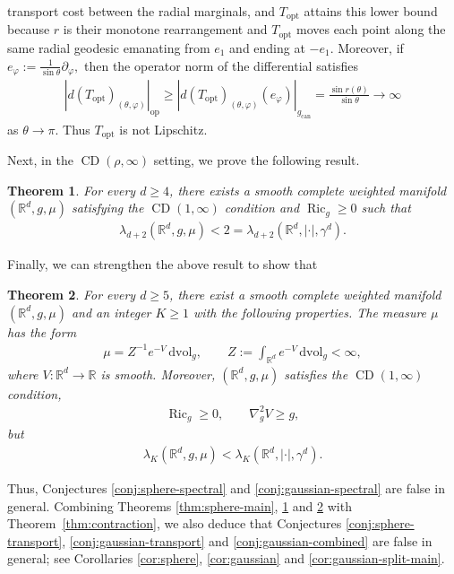 \documentclass[11pt,reqno]{amsart}
\numberwithin{equation}{section}
\newtheorem{mainthm}{Theorem}
\theoremstyle{definition}
\theoremstyle{remark}
\def\bR {\mathbb{R}}
\newcommand{\0}{\emptyset}
\newcommand{\Ric}{\operatorname{Ric}}
\newcommand{\can}{\mathrm{can}}
\newcommand{\dvol}{\,\mathrm{dvol}}
\newcommand{\CD}{\operatorname{CD}}
\begin{document}
transport cost between the radial marginals, and $T_{\mathrm{opt}}$
attains this lower bound because $r$ is their monotone rearrangement and
$T_{\mathrm{opt}}$ moves each point along the same radial geodesic emanating from $e_1$ and ending at $-e_1.$ Moreover,
if $ e_\varphi :=\frac{1}{\sin\theta}\partial_\varphi,$ then the operator norm of the differential satisfies
\begin{align}
        \left|
        d(T_{\mathrm{opt}})_{(\theta,\varphi)}
        \right|_{\mathrm{op}}
        \geq
        \left|
        d(T_{\mathrm{opt}})_{(\theta,\varphi)}
        (e_\varphi)
        \right|_{g_{\can}}
        =
        \frac{\sin r(\theta)}{\sin\theta}
        \rightarrow
        \infty
\end{align}
as $\theta\to\pi$. Thus $T_{\mathrm{opt}}$ is not Lipschitz.

Next, in the $\CD(\rho,\infty)$ setting, we prove the following result.
\begin{mainthm}\label{thm:gaussian-main}
For every $d\geq4$, there exists a smooth complete weighted manifold $(\bR^d,g,\mu)$ satisfying the $\CD(1,\infty)$ condition and $\Ric_g\geq0$ such that
\begin{align}\label{eqn:index-gaussian-K}
\lambda_{d+2}(\bR^d,g,\mu)<2=
\lambda_{d+2}(\bR^d,|\cdot|,
\gamma^d).    
\end{align}
\end{mainthm}
Finally, we can strengthen the above result to show that
\begin{mainthm}\label{thm:gaussian-split-main}
For every $d\geq5$, there exist a smooth complete weighted manifold $(\bR^d,g,\mu)$ and an integer $K\geq1$ with the following properties. The measure $\mu$ has the form
\begin{align}
        \mu
        =
        Z^{-1}e^{-V}\dvol_g,
        \qquad
        Z
        :=
        \int_{\bR^d}e^{-V}\dvol_g
        <
        \infty,
\end{align}
where $V:\bR^d\to\bR$ is smooth. Moreover,
$(\bR^d,g,\mu)$ satisfies the $\CD(1,\infty)$ condition,
\begin{align}
        \Ric_g
        \geq
        0,
        \qquad
        \nabla_g^2V
        \geq
        g,
\end{align}
but
\begin{align}\label{eqn:index-gaussian-split-K}
        \lambda_K(\bR^d,g,\mu)
        <
        \lambda_K(\bR^d,|\cdot|,\gamma^d).
\end{align}
\end{mainthm}
Thus, Conjectures \ref{conj:sphere-spectral} and \ref{conj:gaussian-spectral} are false in general. Combining Theorems \ref{thm:sphere-main}, \ref{thm:gaussian-main} and \ref{thm:gaussian-split-main} with Theorem~\ref{thm:contraction}, we also deduce that Conjectures \ref{conj:sphere-transport}, \ref{conj:gaussian-transport} and \ref{conj:gaussian-combined} are false in general; see Corollaries \ref{cor:sphere}, \ref{cor:gaussian} and \ref{cor:gaussian-split-main}.
\end{document}
